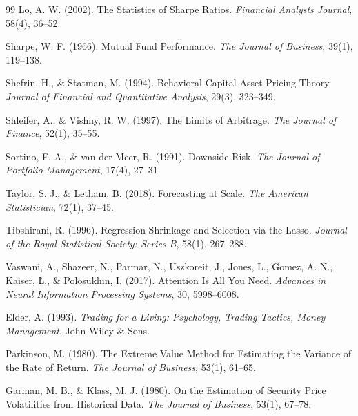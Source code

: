 ﻿\documentclass[11pt,a4paper]{article}
\begin{document}
\begin{thebibliography}{99}
Lo, A. W. (2002).
\newblock The Statistics of Sharpe Ratios.
\newblock \textit{Financial Analysts Journal}, 58(4), 36--52.

Sharpe, W. F. (1966).
\newblock Mutual Fund Performance.
\newblock \textit{The Journal of Business}, 39(1), 119--138.

Shefrin, H., \& Statman, M. (1994).
\newblock Behavioral Capital Asset Pricing Theory.
\newblock \textit{Journal of Financial and Quantitative Analysis}, 29(3), 323--349.

Shleifer, A., \& Vishny, R. W. (1997).
\newblock The Limits of Arbitrage.
\newblock \textit{The Journal of Finance}, 52(1), 35--55.

Sortino, F. A., \& van der Meer, R. (1991).
\newblock Downside Risk.
\newblock \textit{The Journal of Portfolio Management}, 17(4), 27--31.

Taylor, S. J., \& Letham, B. (2018).
\newblock Forecasting at Scale.
\newblock \textit{The American Statistician}, 72(1), 37--45.

Tibshirani, R. (1996).
\newblock Regression Shrinkage and Selection via the Lasso.
\newblock \textit{Journal of the Royal Statistical Society: Series B}, 58(1), 267--288.

Vaswani, A., Shazeer, N., Parmar, N., Uszkoreit, J., Jones, L., Gomez, A. N., Kaiser, \L., \& Polosukhin, I. (2017).
\newblock Attention Is All You Need.
\newblock \textit{Advances in Neural Information Processing Systems}, 30, 5998--6008.

Elder, A. (1993).
\newblock \textit{Trading for a Living: Psychology, Trading Tactics, Money Management}.
\newblock John Wiley \& Sons.

Parkinson, M. (1980).
\newblock The Extreme Value Method for Estimating the Variance of the Rate of Return.
\newblock \textit{The Journal of Business}, 53(1), 61--65.

Garman, M. B., \& Klass, M. J. (1980).
\newblock On the Estimation of Security Price Volatilities from Historical Data.
\newblock \textit{The Journal of Business}, 53(1), 67--78.


\end{thebibliography}
\end{document}
